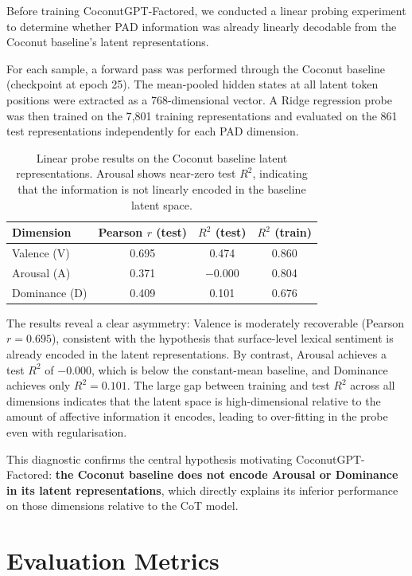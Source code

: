 Before training CoconutGPT-Factored, we conducted a linear probing experiment to determine whether PAD information was already linearly decodable from the Coconut baseline's latent representations.

For each sample, a forward pass was performed through the Coconut baseline (checkpoint at epoch 25).
The mean-pooled hidden states at all latent token positions were extracted as a 768-dimensional vector.
A Ridge regression probe was then trained on the 7{,}801 training representations and evaluated on the 861 test representations independently for each PAD dimension.

\begin{table}[H]
\centering
\begin{tabular}{lccc}
\toprule
\textbf{Dimension} & \textbf{Pearson $r$ (test)} & \textbf{$R^2$ (test)} & \textbf{$R^2$ (train)} \\
\midrule
Valence (V)   & 0.695 & \phantom{$-$}0.474 & 0.860 \\
Arousal (A)   & 0.371 & $-$0.000 & 0.804 \\
Dominance (D) & 0.409 & \phantom{$-$}0.101 & 0.676 \\
\bottomrule
\end{tabular}
\caption{Linear probe results on the Coconut baseline latent representations. Arousal shows near-zero test $R^2$, indicating that the information is not linearly encoded in the baseline latent space.}
\label{tab:probe_baseline}
\end{table}

The results reveal a clear asymmetry: Valence is moderately recoverable (Pearson $r = 0.695$), consistent with the hypothesis that surface-level lexical sentiment is already encoded in the latent representations.
By contrast, Arousal achieves a test $R^2$ of $-0.000$, which is below the constant-mean baseline, and Dominance achieves only $R^2 = 0.101$.
The large gap between training and test $R^2$ across all dimensions indicates that the latent space is high-dimensional relative to the amount of affective information it encodes, leading to over-fitting in the probe even with regularisation.

This diagnostic confirms the central hypothesis motivating CoconutGPT-Factored: \textbf{the Coconut baseline does not encode Arousal or Dominance in its latent representations}, which directly explains its inferior performance on those dimensions relative to the CoT model.

\section{Evaluation Metrics}

